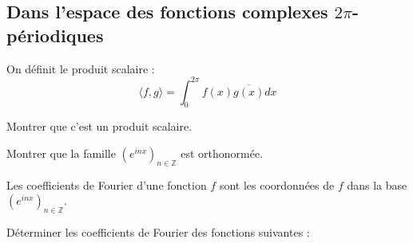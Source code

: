 \subsection{Dans l'espace des fonctions complexes $2\pi$-périodiques}

On définit le produit scalaire :
$$
\langle f, g \rangle = \int_{0}^{2\pi} f(x) \overline{g(x)} dx
$$

Montrer que c'est un produit scalaire.

Montrer que la famille $(e^{inx})_{n \in \mathbb{Z}}$ est orthonormée.

Les coefficients de Fourier d'une fonction $f$ sont les coordonnées de $f$ dans la base $(e^{inx})_{n \in \mathbb{Z}}$.

Déterminer les coefficients de Fourier des fonctions suivantes :

